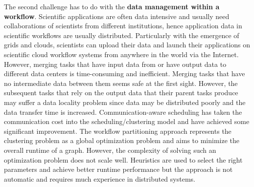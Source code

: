 The second challenge has to do with the \textbf{data management within a workflow}. Scientific applications are often data intensive and usually need collaborations of scientists from different institutions, hence application data in scientific workflows are usually distributed. Particularly with the emergence of grids and clouds, scientists can upload their data and launch their applications on scientific cloud workflow systems from anywhere in the world via the Internet. However, merging tasks that have input data from or have output data to different data centers is time-consuming and inefficient. Merging tasks that have no intermediate data between them seems safe at the first sight. However, the subsequent tasks that rely on the output data that their parent tasks produce may suffer a data locality problem since data may be distributed poorly and the data transfer time is increased. Communication-aware scheduling \cite{Sonmez2006, Jones2004} has taken the communication cost into the scheduling/clustering model and have achieved some significant improvement. The workflow partitioning approach \cite{Hedayat2009, Yuan2010, Wieczorek2005,Rubing2005} represents the clustering problem as a global optimization problem and aims to minimize the overall runtime of a graph. However, the complexity of solving such an optimization problem does not scale well. Heuristics \cite{Maheshwari2012, Callaghan2010} are used to select the right parameters and achieve better runtime performance but the approach is not automatic and requires much experience in distributed systems. 



